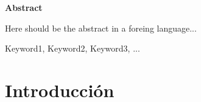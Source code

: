 \documentclass[spanish,a4paper,14pt,oneside]{extreport}
\newenvironment{summary}
{\par\noindent\begin{center}\textbf{Abstract}\end{center}\begin{itshape}\par\noindent}
{\end{itshape}}
\newenvironment{keywords}
{\begin{list}{}{\setlength{\leftmargin}{1em}}\item[\hskip\labelsep \bfseries Keywords:]}
{\end{list}}
\begin{document}
\newpage  %
\begin{summary}
{\em

Here should be the abstract in a foreing language...

}

\begin{keywords}
Keyword1, Keyword2, Keyword3, ...
\end{keywords}

\end{summary}

\newpage{\pagestyle{empty}}
\thispagestyle{empty}



\pagestyle{myheadings} %

\renewcommand{\thepage}{\roman{page}}
\setcounter{page}{1}


\tableofcontents

\newpage{\pagestyle{empty}}

\listoffigures

\newpage{\pagestyle{empty}}

\listoftables

\newpage{\pagestyle{empty}}

\renewcommand{\thepage}{\arabic{page}}
\setcounter{page}{1}


\chapter{Introducción}
\label{chapter:introduccion}
\end{document}
